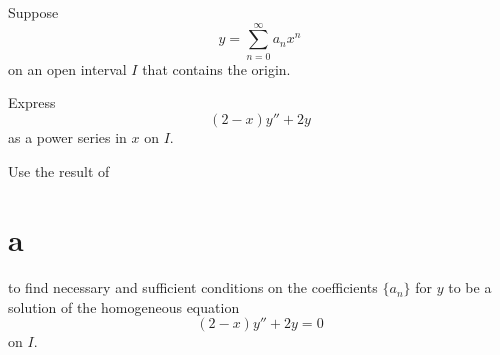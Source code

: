 \begin{example}
  \label{example:7.1.6} \rm Suppose
  \[
    y=\sum_{n=0}^{\infty}a_{n}x^{n}
  \]
  on an open interval $I$ that contains the origin.
  \begin{alist}
    \item %
    Express
    \[
      (2-x)y''+2y
    \]
    as a power series in $x$ on $I$.

    \item %
    Use the result of \part{a} to find necessary and sufficient conditions on the coefficients
    $\{a_{n}\}$ for $y$ to be a solution of the homogeneous equation
    \begin{equation}
      \label{eq:7.1.13}(2-x)y''+2y=0
    \end{equation}
    on $I$.
  \end{alist}
\end{example}

